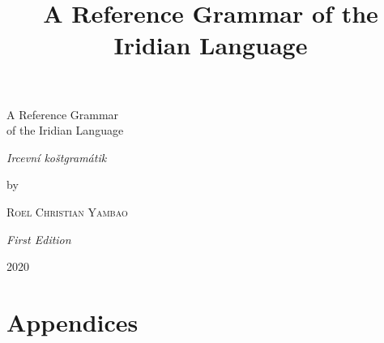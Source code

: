 \documentclass[11pt]{scrbook}
\begin{document}
\author{}
\title{A Reference Grammar of the Iridian Language}
\date{}

\frontmatter


\begin{titlepage}
        \centering
        \vspace{4\baselineskip}
        {\Huge
        A Reference Grammar\\of the Iridian Language\par}
        \vspace{\baselineskip}
        {\Large\itshape Ircevní koštgramátik}

        \vspace{4\baselineskip}

        by\par
        {\Large\textsc{Roel Christian Yambao}\par}
        \vfill
        {\em First Edition}\par
        {2020}
\end{titlepage}


\tableofcontents

\cleardoublepage

\listoftables
{}

\listoffigures
{}



\mainmatter


\appendix
\part*{Appendices}



\cleardoublepage
\nocite{*}
\printbibliography
{}

\cleardoublepage
\printindex
{}
\cleardoublepage
\end{document}
